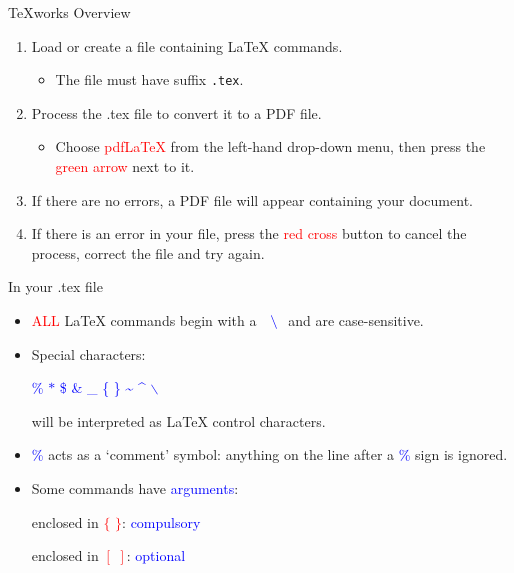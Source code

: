 \documentclass{beamer}
\newcommand{\bc}{\begin{center}}
\newcommand{\ec}{\end{center}}
\newcommand{\lx}{{\LaTeX} }
\def\mynormal{\vspace*{-0.5cm}}
\begin{document}
\begin{frame}{TeXworks Overview}
\mynormal
\medskip
\begin{enumerate}
\item Load or create a file containing \lx commands. 
\begin{itemize}
\item The file must have suffix \texttt{.tex}.
\end{itemize}
\bigskip
\pause
\item Process the .tex file to convert it to a PDF file.
\begin{itemize}
\item Choose \textcolor{red}{pdfLaTeX} from the left-hand drop-down menu, then 
press the \textcolor{red}{green arrow} next to it.
\end{itemize}
\bigskip
\pause
\item If there are no errors, a PDF file will appear containing your document.
\bigskip
\pause
\item If there is an error in your file, press the \textcolor{red}{red cross} button to cancel the process, correct the file 
and try again.
\end{enumerate}
\begin{flushright}
\end{flushright}
\end{frame}

\begin{frame}{In your .tex file}
\mynormal
\medskip
\begin{itemize}
\pause
\item\textcolor{red}{ALL} \lx commands begin with a \,\,
$\textcolor{blue}{\backslash}$\,\,
and are case-sensitive.
\pause
\item Special characters:
\bc
\textcolor{blue}{
\% $\ast$ \$ \& \_ \{ \} \~{} \^{} $\backslash$}
\ec
will be interpreted as \lx control characters.
\pause
\item \textcolor{blue}{\%} acts as a `comment' symbol: anything on the line
after a \textcolor{blue}{\%} sign is ignored.
\pause
\item Some commands have \textcolor{blue}{arguments}:

\begin{center}
enclosed in \textcolor{red}{$\{\,\,\}$}: \textcolor{blue}{compulsory}\\
\end{center}
\begin{center}
enclosed in \textcolor{red}{$[\,\,]$}: \textcolor{blue}{optional}\\
\end{center}
\end{itemize}
\end{frame}
\end{document}
